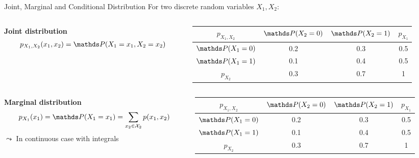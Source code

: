 \documentclass[11pt,compress,t,notes=noshow, aspectratio=169, xcolor=table]{beamer}
\begin{document}
\begin{frame}{Joint, Marginal and Conditional Distribution}
    For two discrete random variables $X_1, X_2$:
    
    \begin{columns}[c, totalwidth=\textwidth]
    \begin{column}{0.5\textwidth}
    \textbf{Joint distribution}
        \begin{align*}
            p_{X_1, X_2}(x_1,x_2) = \P(X_1 = x_1, X_2 = x_2) %
        \end{align*}
    \end{column}
    \begin{column}{0.5\textwidth}
    \begin{table}
    \scriptsize
        \begin{tabular}{|c|c|c|c|}
            \hline 
            $p_{X_1, X_2}$ & $\P(X_2 = 0)$ & $\P(X_2 = 1)$ & $p_{X_1}$ \\
            \hline
            $\P(X_1 = 0)$ & \cellcolor{gray}0.2 & \cellcolor{gray}0.3 & 0.5  \\
            \hline
            $\P(X_1 = 1)$ & \cellcolor{gray}0.1 & \cellcolor{gray}0.4 & 0.5  \\
            \hline
            $p_{X_2}$ & 0.3 & 0.7 & 1  \\
            \hline
        \end{tabular} 
    \end{table}
    \end{column}
    \end{columns} 

\medskip\pause
    
\begin{columns}[c, totalwidth=\textwidth]
    \begin{column}{0.5\textwidth}
    \textbf{Marginal distribution}
        \begin{align*}
            p_{X_1}(x_1) = \P(X_1 = x_1) = \sum_{x_2\in \mathcal{X}_2} p(x_1,x_2)
        \end{align*}    
        $\leadsto$ In continuous case with integrals
    \end{column}
    \begin{column}{0.5\textwidth}
    \begin{table}
    \scriptsize
        \begin{tabular}{|c|c|c|c|}
            \hline 
            $p_{X_1, X_2}$ & $\P(X_2 = 0)$ & $\P(X_2 = 1)$ & $p_{X_1}$ \\
            \hline
            $\P(X_1 = 0)$ & 0.2 & 0.3 & \cellcolor{gray}0.5  \\
            \hline
            $\P(X_1 = 1)$ & 0.1 & 0.4 & \cellcolor{gray}0.5  \\
            \hline
            $p_{X_2}$ & 0.3 & 0.7 & 1  \\
            \hline
        \end{tabular}
    \end{table}
    \end{column}
    \end{columns} 


\end{frame}
\end{document}
